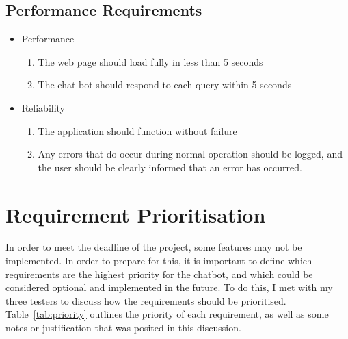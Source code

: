 \subsection{Performance Requirements}
\begin{itemize}
	\item Performance
	\begin{enumerate}[label*=P\arabic*.]
		\item The web page should load fully in less than 5 seconds
		\item The chat bot should respond to each query within 5 seconds
	\end{enumerate}
	\item Reliability
	\begin{enumerate}[resume*]
		\item The application should function without failure
		\item Any errors that do occur during normal operation should be logged, and the user should be clearly informed that an error has occurred.
	\end{enumerate}
\end{itemize}

\section{Requirement Prioritisation}
\label{sec:priority}
In order to meet the deadline of the project, some features may not be implemented. In order to prepare for this, it is important to define which requirements are the highest priority for the chatbot, and which could be considered optional and implemented in the future. To do this, I met with my three testers to discuss how the requirements should be prioritised. Table~\ref{tab:priority} outlines the priority of each requirement, as well as some notes or justification that was posited in this discussion.

